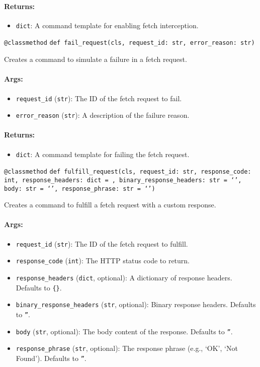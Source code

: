 \documentclass{article}
\begin{document}
\paragraph{Returns:}
\begin{itemize}
    \item \texttt{dict}: A command template for enabling fetch interception.
\end{itemize}

\noindent\texttt{@classmethod}
\noindent\texttt{def fail\_request(cls, request\_id: str, error\_reason: str)}

\noindent Creates a command to simulate a failure in a fetch request.

\paragraph{Args:}
\begin{itemize}
    \item \texttt{request\_id} (\texttt{str}): The ID of the fetch request to fail.
    \item \texttt{error\_reason} (\texttt{str}): A description of the failure reason.
\end{itemize}

\paragraph{Returns:}
\begin{itemize}
    \item \texttt{dict}: A command template for failing the fetch request.
\end{itemize}

\noindent\texttt{@classmethod}
\noindent\texttt{def fulfill\_request(cls, request\_id: str, response\_code: int, response\_headers: dict = {}, binary\_response\_headers: str = `', body: str = `', response\_phrase: str = `')}

\noindent Creates a command to fulfill a fetch request with a custom response.

\paragraph{Args:}
\begin{itemize}
    \item \texttt{request\_id} (\texttt{str}): The ID of the fetch request to fulfill.
    \item \texttt{response\_code} (\texttt{int}): The HTTP status code to return.
    \item \texttt{response\_headers} (\texttt{dict}, optional): A dictionary of response headers. Defaults to \texttt{\{\}}.
    \item \texttt{binary\_response\_headers} (\texttt{str}, optional): Binary response headers. Defaults to \texttt{''}.
    \item \texttt{body} (\texttt{str}, optional): The body content of the response. Defaults to \texttt{''}.
    \item \texttt{response\_phrase} (\texttt{str}, optional): The response phrase (e.g., `OK', `Not Found'). Defaults to \texttt{''}.
\end{itemize}
\end{document}
